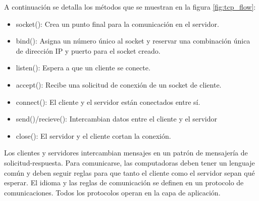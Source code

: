 A continuación se detalla los métodos que se muestran en la figura \ref{fig:tcp_flow}:
\begin{itemize}
    \item socket(): Crea un punto final para la comunicación en el servidor.
    \item bind(): Asigna un número único al socket y reservar una combinación única de dirección IP y puerto para el socket creado.
    \item listen(): Espera a que un cliente se conecte.
    \item accept(): Recibe una solicitud de conexión de un socket de cliente.
    \item connect(): El cliente y el servidor están conectados entre sí.
    \item send()/recieve(): Intercambian datos entre el cliente y el servidor
    \item close(): El servidor y el cliente cortan la conexión.
\end{itemize}




Los clientes y servidores intercambian mensajes en un patrón de mensajería de solicitud-respuesta. Para comunicarse, las computadoras deben tener un lenguaje común y deben seguir reglas para que tanto el cliente como el servidor sepan qué esperar. El idioma y las reglas de comunicación se definen en un protocolo de comunicaciones. Todos los protocolos operan en la capa de aplicación.\\

